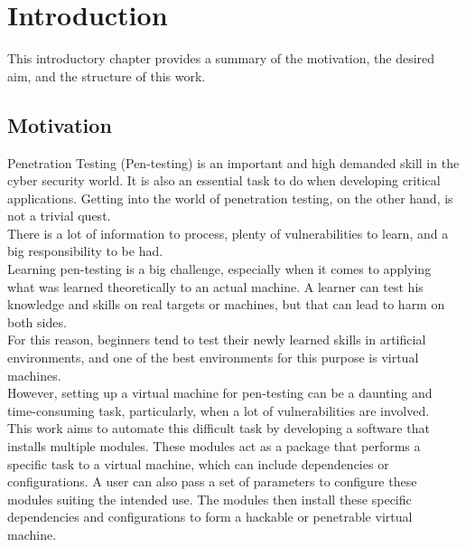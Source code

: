 \chapter{Introduction}
This introductory chapter provides a summary of the motivation, the desired aim, and the structure of this work.

\section{Motivation}
Penetration Testing (Pen-testing) is an important and high demanded skill in the cyber security world. It is also an essential task to do when developing critical applications.
Getting into the world of penetration testing, on the other hand, is not a trivial quest.\\
There is a lot of information to process, plenty of vulnerabilities to learn, and a big responsibility to be had.\\
Learning pen-testing is a big challenge, especially when it comes to applying what was learned theoretically to an actual machine. A learner can test his knowledge and skills on real targets or machines, but that can lead to harm on both sides.\\
For this reason, beginners tend to test their newly learned skills in artificial environments, and one of the best environments for this purpose is virtual machines.\\
However, setting up a virtual machine for pen-testing can be a daunting and time-consuming task, particularly, when a lot of vulnerabilities are involved.\\
This work aims to automate this difficult task by developing a software that installs multiple modules. These modules act as a package that performs a specific task to a virtual machine, which can include dependencies or configurations. A user can also pass a set of parameters to configure these modules suiting the intended use. The modules then install these specific dependencies and configurations to form a hackable or penetrable virtual machine.


